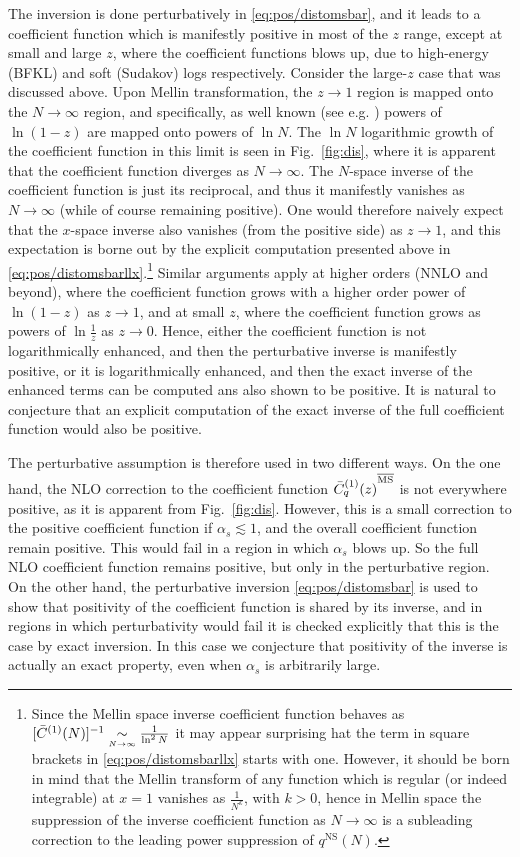 The
inversion is done perturbatively in \cref{eq:pos/distomsbar}, and it
leads to a coefficient function which is manifestly positive in most
of the $z$ range, except at small and large $z$, where the coefficient
functions blows up, due to high-energy (BFKL) and soft (Sudakov) logs
respectively. Consider the large-$z$ case that was discussed
above. Upon 
Mellin transformation, the $z\to 1$ region is mapped onto the
$N\to\infty$ region, and specifically, as well known (see
e.g. \cite{Forte:2002ni}) powers of $\ln(1-z)$ are mapped onto
powers of $\ln N$.  
The $\ln N$ logarithmic growth of the coefficient function in this limit is
seen in Fig.~\ref{fig:dis}, where it is apparent that the coefficient function
diverges as $N\to\infty$. The $N$-space inverse of the coefficient function is
just its reciprocal, and thus it manifestly vanishes as $N\to\infty$ (while of
course remaining positive).
One would therefore naively expect that the $x$-space inverse also vanishes
(from the positive side) as $z\to1$, and this expectation is borne out by the
explicit computation presented above in
\cref{eq:pos/distomsbarllx}.\footnote{
  Since the Mellin space inverse coefficient function behaves as $[\bar
  C^{(1)}(N)]^{-1}\mathrel{\mathop{\sim}\limits_{\scriptscriptstyle {N\rightarrow\infty }}}\frac{1}{\ln^2 N}$ it may appear surprising hat the
  term in square brackets in \cref{eq:pos/distomsbarllx} starts with one.
  However, it should be born in mind that the Mellin transform of any function
  which is regular (or indeed integrable) at $x=1$ vanishes as $\frac{1}{N^k}$,
  with $k>0$, hence in Mellin space the suppression of the inverse coefficient
  function as $N\to\infty$ is a subleading correction to the leading power
  suppression of $q^{\textrm{NS}}(N)$.
}
Similar arguments apply at higher orders (NNLO and beyond), where the
coefficient function grows with a higher order power of $\ln(1-z)$ as $z\to1$,
and at small $z$, where the coefficient function grows as powers of $\ln
\frac{1}{z}$ as $z\to0$.
Hence, either the coefficient function is not logarithmically enhanced, and
then the perturbative inverse is manifestly positive, or it is logarithmically
enhanced, and then the exact inverse of the enhanced terms can be computed ans
also shown to be positive.
It is natural to conjecture that an explicit computation of the exact inverse
of the full coefficient function would also be positive.

The perturbative  assumption is therefore used in two different
ways. On the one hand, the NLO correction to the \msbar{}  coefficient function
 ${\bar  C^{(1)}_q(z)}^{{\overline{\textrm{MS}}}}$ is not everywhere positive, as it is
apparent from Fig.~\ref{fig:dis}. However, this is a small correction
to the positive coefficient function if $\alpha_s\lesssim 1$, and the
overall coefficient function remain positive. This would fail in a
region in which $\alpha_s$ blows up. So the full NLO coefficient
function remains positive, but only in the perturbative region. On the other
hand, the perturbative inversion \cref{eq:pos/distomsbar} is used to
show that positivity of the coefficient function is shared by its
inverse, and in regions in which perturbativity would fail it is
checked explicitly that this is the case by exact inversion. In this
case we conjecture that positivity of the inverse is actually an exact
property, even when $\alpha_s$ is arbitrarily large.


